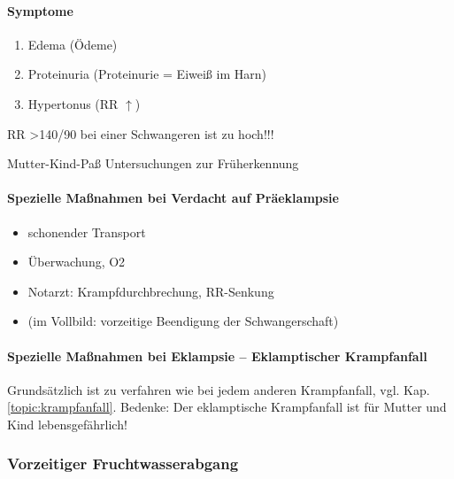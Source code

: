 
\paragraph{Symptome}

\begin{enumerate}
    \item Edema (\"Odeme)
    \item Proteinuria (Proteinurie = Eiwei{\ss} im Harn)
    \item Hypertonus (RR  ${\uparrow}$)
\end{enumerate}


RR {\textgreater}140/90 bei einer Schwangeren ist zu  hoch!!!

Mutter-Kind-Pa{\ss} Untersuchungen zur  Fr\"uherkennung



\begin{gMassnahmenEnv}
  \paragraph{Spezielle Maßnahmen bei Verdacht auf
Präeklampsie}
\begin{itemize}
\item schonender Transport
\item \"Uberwachung, O2
\item Notarzt: Krampfdurchbrechung, RR-Senkung
\item (im Vollbild: vorzeitige Beendigung der  Schwangerschaft)
\end{itemize}  
\end{gMassnahmenEnv}

\begin{gMassnahmenEnv}
  \paragraph{Spezielle Maßnahmen bei Eklampsie --
  Eklamptischer Krampfanfall}
Grundsätzlich ist zu verfahren wie bei jedem anderen
Krampfanfall, vgl. Kap. \ref{topic:krampfanfall}. Bedenke:
Der eklamptische Krampfanfall ist für Mutter und Kind lebensgefährlich!
\end{gMassnahmenEnv}


\subsubsection{Vorzeitiger Fruchtwasserabgang}

